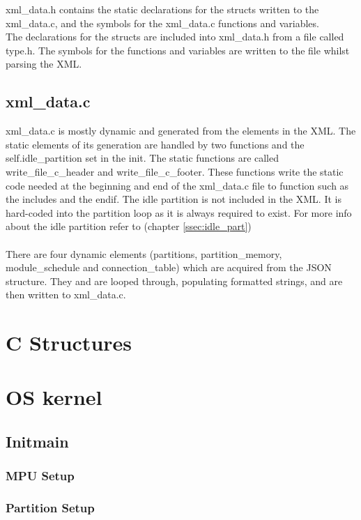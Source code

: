 xml\_data.h contains the static declarations for the structs written to the xml\_data.c, and the symbols for the xml\_data.c functions and variables. 
\\
The declarations for the structs are included into xml\_data.h from a file called type.h. The symbols for the functions and variables are written to the file whilst parsing the XML.

\subsection{xml\_data.c}

xml\_data.c is mostly dynamic and generated from the elements in the XML. 
The static elements of its generation are handled by two functions and the self.idle\_partition set in the init. The static functions are called write\_file\_c\_header and write\_file\_c\_footer. These functions write the static code needed at the beginning and end of the xml\_data.c file to function such as the includes and the endif.
The idle partition is not included in the XML. It is hard-coded into the partition loop as it is always required to exist. For more info about the idle partition refer to (chapter \ref{ssec:idle_part}) 
\\\\
There are four dynamic elements (partitions, partition\_memory, module\_schedule and connection\_table) which are acquired from the JSON structure. They and are looped through, populating formatted strings, and are then written to xml\_data.c.

\section{C Structures}

\section{OS kernel}

\subsection{Init\/main}

\subsubsection{MPU Setup}
\subsubsection{Partition Setup}
